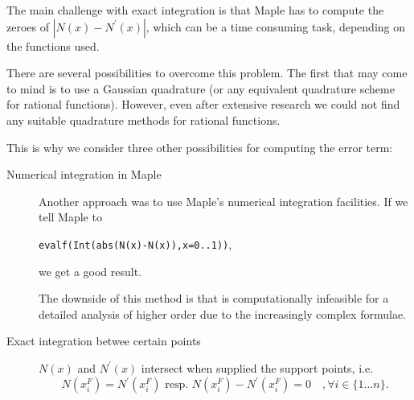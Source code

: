 \documentclass{article}
\newcommand{\todo}[2][]{\textcolor{red}{TODO\ifthenelse{\equal{#1}{}}{}{[#1]}: #2}}
\begin{document}
The main challenge with exact integration is that Maple has to compute the zeroes of $\left|N\left(x\right)-N^\prime\left(x\right)\right|$, which can be a time consuming task, depending on the functions used.

There are several possibilities to overcome this problem. The first that may come to mind is to use a Gaussian quadrature (or any equivalent quadrature scheme for rational functions). However, even after extensive research we could not find any suitable quadrature methods for rational functions.

This is why we consider three other possibilities for computing the error term:

\begin{description}
\item[Numerical integration in Maple] Another approach was to use Maple's numerical integration facilities. If we tell Maple to
  \begin{center}
    \texttt{evalf(Int(abs(N(x)-N(x)),x=0..1))},
  \end{center}
  we get a good result.




  The downside of this method is that is computationally infeasible for a detailed analysis of higher order due to the increasingly complex formulae.
\item[Exact integration betwee certain points] $N\left(x\right)$ and $N^\prime\left(x\right)$ intersect when supplied the support points, i.e.\,
  \begin{equation*}
    N\left(x_i^F\right) = N^\prime\left(x_i^F\right) \text{ resp. } N\left( x_i^F \right) - N^\prime\left( x_i^F \right) = 0 \quad , \forall i \in \{1 \dots n\}.
  \end{equation*}


\end{description}
\end{document}
